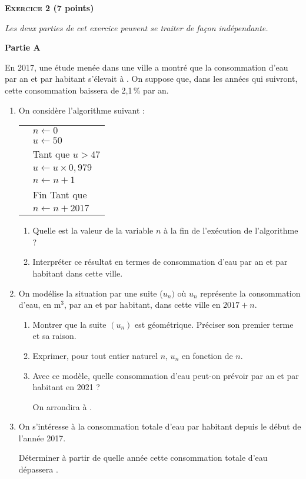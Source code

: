 \documentclass[10pt,a4paper,french]{article}
\begin{document}
\vspace{0,25cm}

\textbf{\textsc{Exercice 2} \hfill (7 points)}  

\vspace{0.25cm}

\emph{Les deux parties de cet exercice peuvent se traiter de façon indépendante.}

\medskip

\textbf{Partie A}

\medskip

En 2017, une étude menée dans une ville a montré que la consommation d’eau par an et par habitant
s’élevait à . On suppose que, dans les années qui suivront, cette consommation baissera
de 2,1\,\% par an.

\medskip

\begin{enumerate}
\item  On considère l’algorithme suivant :
\begin{center}
\begin{tabular}[]{|m{1cm} m{3cm}|}
\hline
&$n\leftarrow 0$\\
&$u\leftarrow 50$\\
&Tant que $u > 47$\\
&$u\leftarrow  u \times 0,979$\\
&$n \leftarrow n+1$\\
&Fin Tant que\\
&$n\leftarrow n + 2017$\\
\hline
\end{tabular}
\end{center}

	\begin{enumerate}
		\item Quelle est la valeur de la variable $n$ à la fin de l’exécution de l’algorithme ?
		\item Interpréter ce résultat en termes de consommation d’eau par an et par habitant dans cette ville.
	\end{enumerate}
\item On modélise la situation par une suite ($u_n)$ où $u_n$ représente la consommation d’eau, en m$^3$, par an et par habitant, dans cette ville en $2017 + n$.
	\begin{enumerate}
		\item Montrer que la suite $\left(u_n\right)$ est géométrique. Préciser son premier terme et sa raison.
		\item Exprimer, pour tout entier naturel $n$, $u_n$ en fonction de $n$. 
		\item Avec ce modèle, quelle consommation d’eau peut-on prévoir par an et par habitant en 2021 ?

On arrondira à .
\end{enumerate}
\item On s’intéresse à la consommation totale d’eau par habitant depuis le début de l’année 2017.

Déterminer à partir de quelle année cette consommation totale d’eau dépassera .
\end{enumerate}
\end{document}
